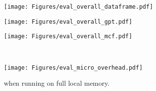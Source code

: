 {
\begin{figure*}[th]
\begin{minipage}{0.48\columnwidth}
\begin{center}
\centerline{\texttt{[image: Figures/eval\_overall\_dataframe.pdf]}}
\vspace{-0.13in}
{
}
\end{center}
\end{minipage}
\hfill
\begin{minipage}{0.48\columnwidth}
\begin{center}
\centerline{\texttt{[image: Figures/eval\_overall\_gpt.pdf]}}
\vspace{-0.13in}
{
}
\end{center}
\end{minipage}
\hfill
\begin{minipage}{0.48\columnwidth}
\begin{center}\centerline{\texttt{[image: Figures/eval\_overall\_mcf.pdf]}}
\vspace{-0.13in}
{ \\
}
\end{center}
\end{minipage}
\hfill
\begin{minipage}{0.48\columnwidth}
\begin{center}
\centerline{\texttt{[image: Figures/eval\_micro\_overhead.pdf]}}
\vspace{-0.13in}
{
when running on full local memory.
}
\end{center}
\end{minipage}
\end{figure*}
}